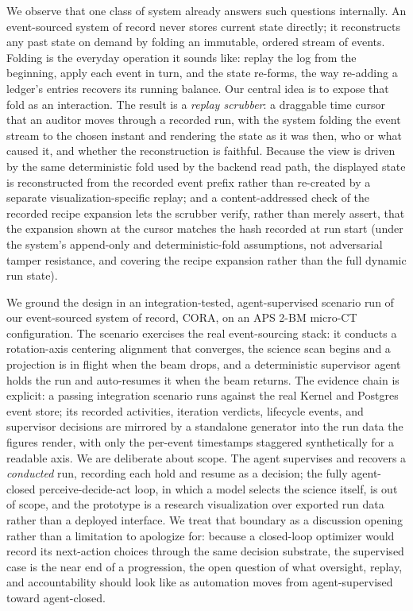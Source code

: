 We observe that one class of system already answers such questions internally.
An event-sourced system of record never stores current state directly; it
reconstructs any past state on demand by folding an immutable, ordered stream of
events. Folding is the everyday operation it sounds like: replay the log from the
beginning, apply each event in turn, and the state re-forms, the way re-adding a
ledger's entries recovers its running balance. Our central idea is to expose that
fold as an interaction. The result is
a \emph{replay scrubber}: a draggable time cursor that an auditor moves through a
recorded run, with the system folding the event stream to the chosen instant and
rendering the state as it was then, who or what caused it, and whether the
reconstruction is faithful. Because the view is driven by the same deterministic
fold used by the backend read path, the displayed state is reconstructed from
the recorded event prefix rather than re-created by a separate
visualization-specific replay; and a content-addressed check of the recorded
recipe expansion lets the scrubber verify, rather than merely assert, that the
expansion shown at the cursor matches the hash recorded at run start (under the
system's append-only and deterministic-fold assumptions, not adversarial tamper
resistance, and covering the recipe expansion rather than the full dynamic run
state).

We ground the design in an integration-tested, agent-supervised scenario run of
our event-sourced system of record, CORA, on an APS 2-BM micro-CT configuration.
The scenario exercises the real event-sourcing stack: it conducts a
rotation-axis centering alignment that converges, the science scan begins and a
projection is in flight when the beam drops, and a deterministic supervisor agent
holds the run and auto-resumes it when the beam returns. The evidence chain is
explicit: a passing integration scenario runs against the real Kernel and
Postgres event store; its recorded activities, iteration verdicts, lifecycle
events, and supervisor decisions are mirrored by a standalone generator into the
run data the figures render, with only the per-event timestamps staggered
synthetically for a readable axis. We are deliberate about scope. The agent
supervises and recovers a \emph{conducted} run, recording each hold and resume
as a decision; the fully agent-closed perceive-decide-act loop, in which a model
selects the science itself, is out of scope, and the prototype is a research
visualization over exported run data rather than a deployed interface. We treat
that boundary as a discussion opening rather than a limitation to apologize for:
because a closed-loop optimizer would record its next-action choices through the
same decision substrate, the supervised case is the near end of a progression,
the open question of what oversight, replay, and accountability should look like
as automation moves from agent-supervised toward agent-closed.

